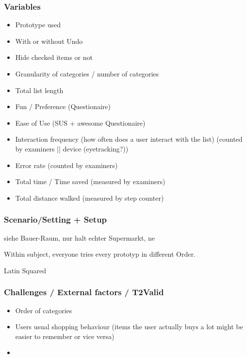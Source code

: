 \documentclass{article}
\begin{document}
\begin{itemize}
\begin{itemize}
    \subsubsection{Variables}
            \begin{itemize}
                \item Prototype used
                    \item With or without Undo
                    \item Hide checked items or not
                \item Granularity of categories / number of categories 
                \item Total list length
            \end{itemize}
            \begin{itemize}
                \item Fun / Preference (Questionaire) %
                \item Ease of Use (SUS + awesome Questionaire)
                \item Interaction frequency (how often does a user interact with the list) (counted by examiners || device (eyetracking?))
                \item Error rate (counted by examiners)
                \item Total time / Time saved (measured by examiners)
                \item Total distance walked (measured by step counter)
            \end{itemize}

    \subsubsection{Scenario/Setting + Setup}   
        siehe Bauer-Raum, nur halt echter Supermarkt, ne

        Within subject, everyone tries every prototyp in different Order.

        Latin Squared
    \subsubsection{Challenges / External factors / T2Valid}
        \begin{itemize}
            \item Order of categories
            \item Users usual shopping behaviour (items the user actually buys a lot might be easier to remember or vice versa)
            \item 
        \end{itemize}


\end{itemize}
\end{itemize}
\end{document}
